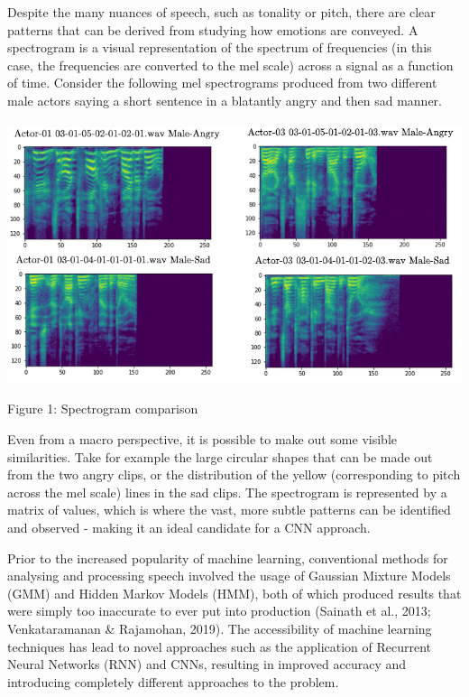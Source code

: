 \documentclass[12pt]{article}
\begin{document}
\noindent Despite the many nuances of speech, such as tonality or pitch, there are clear patterns that can be derived from studying how emotions are conveyed. A spectrogram is a visual representation of the spectrum of frequencies (in this case, the frequencies are converted to the mel scale) across a signal as a function of time. Consider the following mel spectrograms produced from two different male actors saying a short sentence in a blatantly angry and then sad manner.
\\
\\
\includegraphics[width=14cm]{figure_1_spectrogram_comparison}

\noindent Figure 1: Spectrogram comparison
\vspace{0.05cm}

\noindent Even from a macro perspective, it is possible to make out some visible similarities. Take for example the large circular shapes that can be made out from the two angry clips, or the distribution of the yellow (corresponding to pitch across the mel scale) lines in the sad clips. The spectrogram is represented by a matrix of values, which is where the vast, more subtle patterns can be identified and observed - making it an ideal candidate for a CNN approach.

\newpage

\noindent Prior to the increased popularity of machine learning, conventional methods for analysing and processing speech involved the usage of Gaussian Mixture Models (GMM) and Hidden Markov Models (HMM), both of which produced results that were simply too inaccurate to ever put into production (Sainath et al., 2013; Venkataramanan \& Rajamohan, 2019). The accessibility of machine learning techniques has lead to novel approaches such as the application of Recurrent Neural Networks (RNN) and CNNs, resulting in improved accuracy and introducing completely different approaches to the problem.
\\
\end{document}
